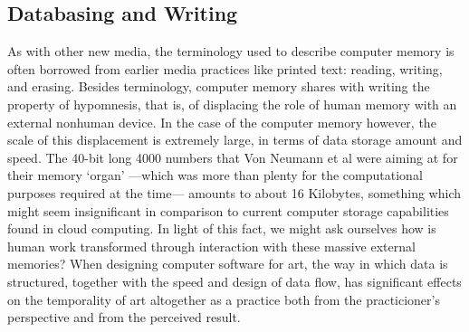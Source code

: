 \subsection{Databasing and Writing}

As with other new media, the terminology used to describe computer memory is often borrowed from earlier media practices like printed text: reading, writing, and erasing. Besides terminology, computer memory shares with writing the property of hypomnesis, that is, of displacing the role of human memory with an external nonhuman device. In the case of the computer memory however, the scale of this displacement is extremely large, in terms of data storage amount and speed. The 40-bit long 4000 numbers that Von Neumann et al were aiming at for their memory `organ' ---which was more than plenty for the computational purposes required at the time--- amounts to about 16 Kilobytes, something which might seem insignificant in comparison to current computer storage capabilities found in cloud computing. In light of this fact, we might ask ourselves how is human work transformed through interaction with these massive external memories? When designing computer software for art, the way in which data is structured, together with the speed and design of data flow, has significant effects on the temporality of art altogether as a practice both from the practicioner's perspective and from the perceived result.

